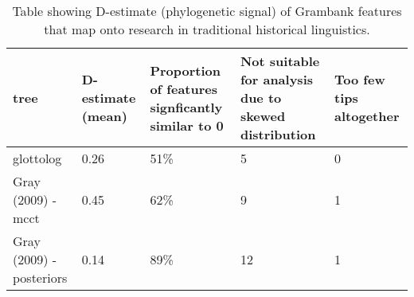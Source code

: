 \begin{table}[ht]
\centering
\begin{tabular}{p{4cm}p{1.8cm}p{3.5cm}p{2.3cm}p{2.3cm}}
  \hline
tree & D-estimate (mean) & Proportion of features signficantly similar to 0 & Not suitable for analysis due to skewed distribution & Too few tips altogether \\ 
  \hline
glottolog & 0.26 & 51\% &   5 & 0 \\ 
  Gray (2009) - mcct & 0.45 & 62\% &   9 & 1 \\ 
  Gray (2009) - posteriors & 0.14 & 89\% &  12 & 1 \\ 
   \hline
\end{tabular}
\caption{Table showing D-estimate (phylogenetic signal) of Grambank features that map onto research in traditional historical linguistics.} 
\label{d_estimate_summary}
\end{table}
